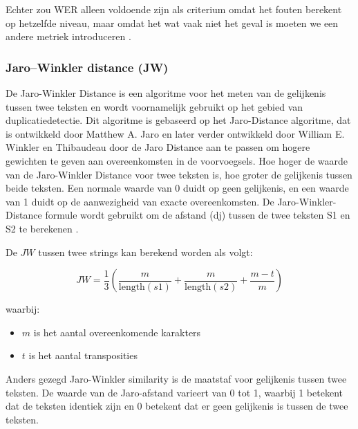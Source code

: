 Echter zou WER alleen voldoende zijn als criterium omdat het fouten berekent op hetzelfde niveau, maar omdat het wat vaak niet het geval is moeten we een andere metriek introduceren \autocite{OConnor2023}.
\subsubsection{Jaro–Winkler distance (JW)}


De Jaro-Winkler Distance is een algoritme voor het meten van de gelijkenis tussen twee teksten en wordt voornamelijk gebruikt op het gebied van duplicatiedetectie. Dit algoritme is gebaseerd op het Jaro-Distance algoritme, dat is ontwikkeld door Matthew A. Jaro en later verder ontwikkeld door William E. Winkler en Thibaudeau door de Jaro Distance aan te passen om hogere gewichten te geven aan overeenkomsten in de voorvoegsels. Hoe hoger de waarde van de Jaro-Winkler Distance voor twee teksten is, hoe groter de gelijkenis tussen beide teksten. Een normale waarde van 0 duidt op geen gelijkenis, en een waarde van 1 duidt op de aanwezigheid van exacte overeenkomsten. De Jaro-Winkler-Distance formule wordt gebruikt om de afstand (dj) tussen de twee teksten  S1 en S2 te berekenen \autocite{Brinardi2017}.

De \(JW\) tussen twee strings kan berekend worden als volgt:

\[
JW = \frac{1}{3} \left( \frac{m}{\text{{length}}(s1)} + \frac{m}{\text{{length}}(s2)} + \frac{m - t}{m} \right)
\]

waarbij:
\begin{itemize}
    \item \(m\) is het aantal overeenkomende karakters
    \item \(t\) is het aantal transposities
\end{itemize}
Anders gezegd Jaro-Winkler similarity is de maatstaf voor gelijkenis tussen twee teksten. De waarde van de Jaro-afstand varieert van 0 tot 1, waarbij 1 betekent dat de teksten identiek zijn en 0 betekent dat er geen gelijkenis is tussen de twee teksten.



